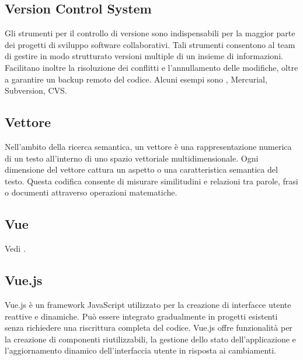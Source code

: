 \vspace{2em}
\subsection*{Version Control System}
\par Gli strumenti per il controllo di versione sono indispensabili per la maggior parte dei progetti di sviluppo software collaborativi. Tali strumenti consentono al team di gestire in modo strutturato versioni multiple di un insieme di informazioni. Facilitano inoltre la risoluzione dei conflitti e l'annullamento delle modifiche, oltre a garantire un backup remoto del codice.
Alcuni esempi sono , Mercurial, Subversion, CVS.

\vspace{2em}
\subsection*{Vettore}
\par Nell’ambito della ricerca semantica, un vettore è una rappresentazione numerica di un testo all’interno di uno spazio vettoriale multidimensionale. Ogni dimensione del vettore cattura un aspetto o una caratteristica semantica del testo. Questa codifica consente di misurare similitudini e relazioni tra parole, frasi o documenti attraverso operazioni matematiche.

\vspace{2em}
\subsection*{Vue}
\par Vedi .

\vspace{2em}
\subsection*{Vue.js}
\par Vue.js è un framework JavaScript utilizzato per la creazione di interfacce utente reattive e dinamiche. Può essere integrato gradualmente in progetti esistenti senza richiedere una riscrittura completa del codice. Vue.js offre funzionalità per la creazione di componenti riutilizzabili, la gestione dello stato dell'applicazione e l'aggiornamento dinamico dell'interfaccia utente in risposta ai cambiamenti.
